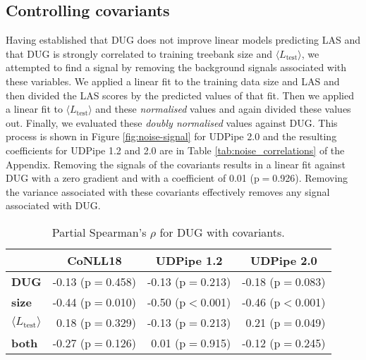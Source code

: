 \documentclass[11pt,a4paper]{article}
\newcommand{\MTL}{{$\langle L_{\textrm{test}}\rangle$}}
\begin{document}
\subsection{Controlling covariants}
Having established that DUG does not improve linear models predicting LAS and that DUG is strongly correlated to training treebank size and \MTL, we attempted to find a signal by removing the background signals associated with these variables. We applied a linear fit to the training data size and LAS and then divided the LAS scores by the predicted values of that fit. Then we applied a linear fit to {\MTL} and these \textit{normalised} values and again divided these values out. Finally, we evaluated these \textit{doubly normalised} values against DUG. This process is shown in Figure \ref{fig:noise-signal} for UDPipe 2.0 and the resulting coefficients for UDPipe 1.2 and 2.0 are in Table \ref{tab:noise_correlations} of the Appendix. Removing the signals of the covariants results in a linear fit against DUG with a zero gradient and with a coefficient of 0.01 (p$=$0.926). Removing the variance associated with these covariants effectively removes any signal associated with DUG. %

\begin{table}[b!]
    \centering
    \small
    \tabcolsep=0.05cm
    \begin{tabular}{lrrr}
    \toprule
\multicolumn{1}{c}{} & \multicolumn{1}{c}{CoNLL18} & \multicolumn{1}{c}{UDPipe 1.2} & \multicolumn{1}{c}{UDPipe 2.0}  \\
\midrule
\textbf{DUG} & -0.13 (p$=$0.458) & -0.13 (p$=$0.213)  &  -0.18 (p$=$0.083)   \\\midrule
\textbf{size}& -0.44 (p$=$0.010) & -0.50 (p$<$0.001)  & -0.46 (p$<$0.001)  \\
\textbf{\MTL} & 0.18 (p$=$0.329) & -0.13 (p$=$0.213) & 0.21 (p$=$0.049) \\
\textbf{both} & -0.27 (p$=$0.126) & 0.01 (p$=$0.915) & -0.12 (p$=$0.245)  \\
\bottomrule
    \end{tabular}
    \caption{Partial Spearman's $\rho$ for DUG with covariants.}
    \label{tab:partial_correlations}
\end{table}
\end{document}

